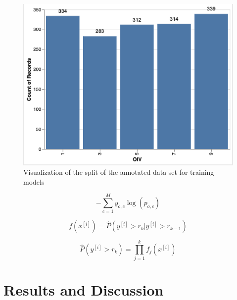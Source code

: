 \documentclass[english]{article}
\begin{document}
\begin{figure}[H]
    \begin{center}
        \includegraphics[width=0.7\linewidth]{2023_a_oiv_oiv_distribution}
        \caption{Visualization of the split of the annotated data set for training models}\label{fig:datadistribution}
    \end{center}
\end{figure}


\begin{equation}
    -\sum_{c=1}^My_{o,c}\log(p_{o,c})\label{fml:crossentropy}
\end{equation}

\begin{equation}
    f(x^{[i]}) = \hat{P}(y^{[i]} > r_{k}|y^{[i]} > r_{k-1})\label{fml:rankprob}
\end{equation}

\begin{equation}
    \hat{P}(y^{[i]} > r_{k}) = \prod_{j=1}^{k}f_{j}(x^{[i]})\label{fml:chainprob}
\end{equation}



\section{Results and Discussion}
\end{document}
